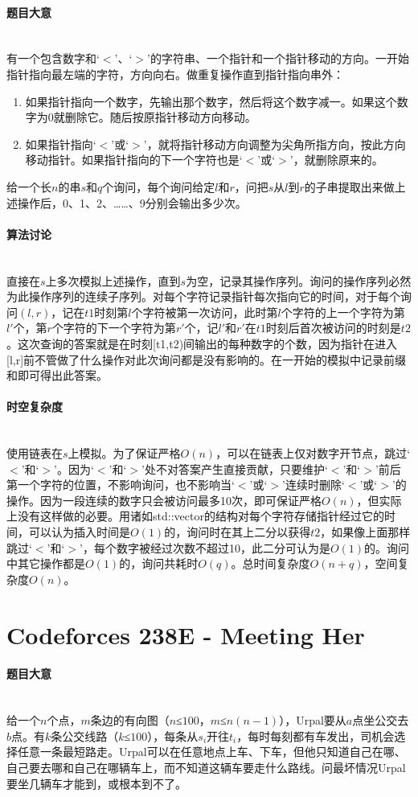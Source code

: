 \documentclass[UTF8]{ctexart}
\newcommand{\myparagraph}[1]{\paragraph{#1}\mbox{}\\}
\theoremstyle{nonumberplain}
\begin{document}
		\myparagraph{题目大意}
		
			有一个包含数字和‘$<$’、‘$>$’的字符串、一个指针和一个指针移动的方向。一开始指针指向最左端的字符，方向向右。做重复操作直到指针指向串外：
			
			\begin{enumerate}
				\item 如果指针指向一个数字，先输出那个数字，然后将这个数字减一。如果这个数字为0就删除它。随后按原指针移动方向移动。
				\item 如果指针指向‘$<$’或‘$>$’，就将指针移动方向调整为尖角所指方向，按此方向移动指针。如果指针指向的下一个字符也是‘$<$’或‘$>$’，就删除原来的。
			\end{enumerate}
			
			给一个长$n$的串$s$和$q$个询问，每个询问给定$l$和$r$，问把$s$从$l$到$r$的子串提取出来做上述操作后，0、1、2、……、9分别会输出多少次。
		
		\myparagraph{算法讨论}
		
			直接在$s$上多次模拟上述操作，直到$s$为空，记录其操作序列。询问的操作序列必然为此操作序列的连续子序列。对每个字符记录指针每次指向它的时间，对于每个询问$(l,r)$，记在$t1$时刻第$l$个字符被第一次访问，此时第$l$个字符的上一个字符为第$l'$个，第$r$个字符的下一个字符为第$r'$个，记$l'$和$r'$在$t1$时刻后首次被访问的时刻是$t2$。这次查询的答案就是在时刻[t1,t2)间输出的每种数字的个数，因为指针在进入[l,r]前不管做了什么操作对此次询问都是没有影响的。在一开始的模拟中记录前缀和即可得出此答案。 
		
		\myparagraph{时空复杂度}
		
			使用链表在$s$上模拟。为了保证严格$O(n)$，可以在链表上仅对数字开节点，跳过‘$<$’和‘$>$’。因为‘$<$’和‘$>$’处不对答案产生直接贡献，只要维护‘$<$’和‘$>$’前后第一个字符的位置，不影响询问，也不影响当‘$<$’或‘$>$’连续时删除‘$<$’或‘$>$’的操作。因为一段连续的数字只会被访问最多10次，即可保证严格$O(n)$，但实际上没有这样做的必要。用诸如std::vector的结构对每个字符存储指针经过它的时间，可以认为插入时间是$O(1)$的，询问时在其上二分以获得$t2$，如果像上面那样跳过‘$<$’和‘$>$’，每个数字被经过次数不超过10，此二分可认为是$O(1)$的。询问中其它操作都是$O(1)$的，询问共耗时$O(q)$。总时间复杂度$O(n+q)$，空间复杂度$O(n)$。
	
	\section{Codeforces 238E - Meeting Her}
	
		\myparagraph{题目大意}
		
			给一个$n$个点，$m$条边的有向图（$n$≤$100$，$m$≤$n(n-1)$），Urpal要从$a$点坐公交去$b$点。有$k$条公交线路（$k$≤$100$），每条从$s_i$开往$t_i$，每时每刻都有车发出，司机会选择任意一条最短路走。Urpal可以在任意地点上车、下车，但他只知道自己在哪、自己要去哪和自己在哪辆车上，而不知道这辆车要走什么路线。问最坏情况Urpal要坐几辆车才能到，或根本到不了。
		
\end{document}
